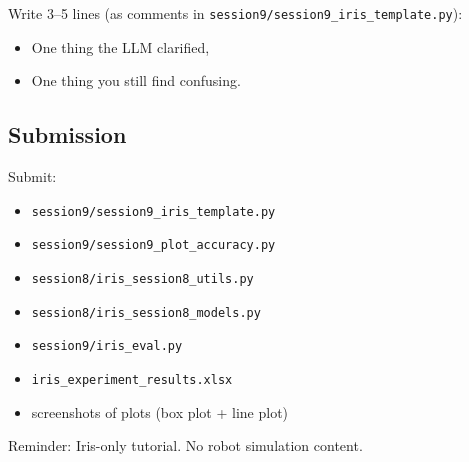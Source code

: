 \noindent
Write 3--5 lines (as comments in \texttt{session9/session9\_iris\_template.py}):
\begin{itemize}\setlength{\itemsep}{0pt}
\item One thing the LLM clarified,
\item One thing you still find confusing.
\end{itemize}

\subsection{Submission}
Submit:
\begin{itemize}\setlength{\itemsep}{0pt}
\item \texttt{session9/session9\_iris\_template.py}
\item \texttt{session9/session9\_plot\_accuracy.py}
\item \texttt{session8/iris\_session8\_utils.py}
\item \texttt{session8/iris\_session8\_models.py}
\item \texttt{session9/iris\_eval.py}
\item \texttt{iris\_experiment\_results.xlsx}
\item screenshots of plots (box plot + line plot)
\end{itemize}

\begin{center}
{\color{red}\Large Reminder: Iris-only tutorial. No robot simulation content.}
\end{center}
